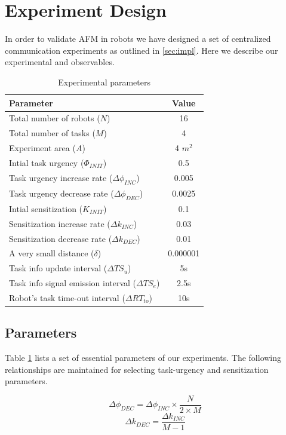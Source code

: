 \documentclass{llncs}
\begin{document}
\section{Experiment Design}
\label{sec:expt-design}
In order to validate AFM in robots we have designed a set of centralized communication experiments as outlined in \ref{sec:impl}. Here we describe our experimental 
and observables.
%
\begin{table}
\caption{Experimental parameters}
\label{table:params}
\begin{center}
\begin{tabular}{|l||c|}
\hline Parameter & Value\\
\hline Total number of robots ($N$) & 16\\
\hline Total number of tasks ($M$) & 4\\
\hline Experiment area ($A$) & 4 $m^2$\\
\hline Intial task urgency ($\Phi_{INIT}$) & 0.5\\
\hline Task urgency increase rate ($\Delta\phi_{INC}$) & 0.005\\
\hline Task urgency decrease rate ($\Delta\phi_{DEC}$) & 0.0025\\
\hline Intial sensitization ($K_{INIT}$) & 0.1\\
\hline Sensitization increase rate ($\Delta k_{INC}$) & 0.03\\
\hline Sensitization decrease rate ($\Delta k_{DEC}$) & 0.01\\
\hline A very small distance ($\delta$)& 0.000001\\
\hline Task info update interval ($\Delta TS_{u}$) & 5s\\
\hline Task info signal emission interval ($ \Delta TS_{e}$)& 2.5s\\
\hline Robot's task time-out interval ($\Delta RT_{to} $)& 10s\\
\hline
\end{tabular}
\end{center}
\end{table}
% 
\subsection{Parameters}
Table \ref{table:params} lists a set of essential parameters of our experiments. The following relationships are maintained for selecting task-urgency and sensitization parameters.
\begin{small}
\begin{equation}
\Delta\phi_{DEC} = \Delta\phi_{INC} \times \frac{N}{2 \times M}
\label{eqn:task-urgency}
\end{equation}
%
\begin{equation}
\Delta k_{DEC} = \frac{\Delta k_{INC}} {M - 1} 
\label{eqn:sensitization}
\end{equation}
\end{small}
%
\end{document}
